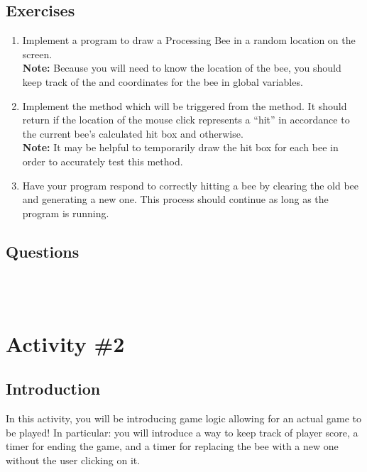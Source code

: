 	\subsection{Exercises}
		\begin{enumerate}
			\item Implement a program to draw a Processing Bee in a random location on the screen.\\
						  {\small\textbf{Note:} Because you will need to know the location of the bee, you should keep track of the  and  coordinates for the bee in global variables.}

			\item Implement the  method which will be triggered from the  method. It should return  if the location of the mouse click represents a ``hit'' in accordance to the current bee's calculated hit box and  otherwise.\\
						{\small\textbf{Note:} It may be helpful to temporarily draw the hit box for each bee in order to accurately test this method.}

			\item Have your program respond to correctly hitting a bee by clearing the old bee and generating a new one. This process should continue as long as the program is running.
		\end{enumerate}

	\subsection{Questions}
		\ \\[9pt]
		\ \\[9pt]

\pagebreak

\section{Activity \#2}
	\subsection{Introduction}
		In this activity, you will be introducing game logic allowing for an actual game to be played! In particular: you will introduce a way to keep track of player score, a timer for ending the game, and a timer for replacing the bee with a new one without the user clicking on it.
